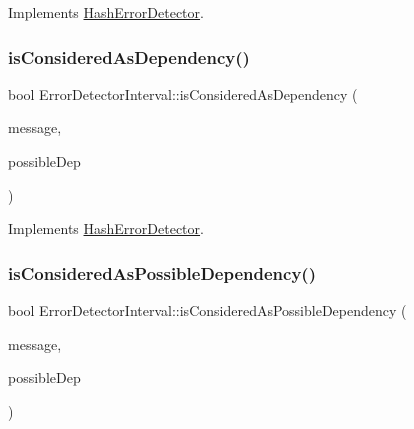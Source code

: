 Implements \hyperlink{class_hash_error_detector_a5b9f7e8a6f63b1582e912102021c2d8d}{Hash\+Error\+Detector}.

\mbox{\label{class_error_detector_interval_a27cb3ca9d7e5c3ddda9ee5ee66f182ed}} 
\subsubsection{\texorpdfstring{is\+Considered\+As\+Dependency()}{isConsideredAsDependency()}}
{\footnotesize\ttfamily bool Error\+Detector\+Interval\+::is\+Considered\+As\+Dependency (\begin{DoxyParamCaption}\item[{const \hyperlink{structures_8h_a7e7bdc1d2fff8a9436f2f352b2711ed6}{message\+Info} \&}]{message,  }\item[{const \hyperlink{structures_8h_a7e7bdc1d2fff8a9436f2f352b2711ed6}{message\+Info} \&}]{possible\+Dep }\end{DoxyParamCaption})\hspace{0.3cm}{\ttfamily [virtual]}}



Implements \hyperlink{class_hash_error_detector_a4693d4d5e327b19f75088cef52bcad7d}{Hash\+Error\+Detector}.

\mbox{\label{class_error_detector_interval_a33bf470042fb65d833fd0f091374a046}} 
\subsubsection{\texorpdfstring{is\+Considered\+As\+Possible\+Dependency()}{isConsideredAsPossibleDependency()}}
{\footnotesize\ttfamily bool Error\+Detector\+Interval\+::is\+Considered\+As\+Possible\+Dependency (\begin{DoxyParamCaption}\item[{const \hyperlink{structures_8h_a7e7bdc1d2fff8a9436f2f352b2711ed6}{message\+Info} \&}]{message,  }\item[{const \hyperlink{structures_8h_a7e7bdc1d2fff8a9436f2f352b2711ed6}{message\+Info} \&}]{possible\+Dep }\end{DoxyParamCaption})\hspace{0.3cm}{\ttfamily [virtual]}}




